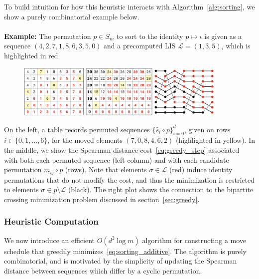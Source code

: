 \documentclass[sn-mathphys]{sn-jnl}
\begin{document}
To build intuition for how this heuristic interacts with Algorithm~\ref{alg:sorting}, we show a purely combinatorial example below.
\\
\\  
\noindent \textbf{Example:} The permutation $p \in S_m$ to sort to the identity $p \mapsto \iota$ is given as a sequence $(4, 2, 7, 1, 8, 6, 3, 5,0)$ and a precomputed LIS $\mathcal{L} = (1, 3, 5)$, which is highlighted in red. 
\begin{figure}[htb!]\label{fig:schedule_construct}
	\center
	\includegraphics[width=0.90\textwidth]{greedy_schedule_construct}
\end{figure}
On the left, a table records permuted sequences $\{ \hat{s}_i \circ p \}_{i=0}^d$, given on rows $i \in \{0, 1, \dots, 6\}$, for the moved elements $(7, 0, 8, 4, 6, 2)$ (highlighted in yellow). 
 In the middle, we show the Spearman distance cost~\eqref{eq:greedy_step} associated with both each permuted sequence (left column) and with each candidate permutation $m_{ij} \circ p$ (rows). Note that elements $\sigma \in \mathcal{L}$ (red) induce identity permutations that do not modify the cost, and thus the minimization is restricted to elements $\sigma \in p \setminus \mathcal{L}$ (black). 
 The right plot shows the connection to the bipartite crossing minimization problem discussed in section~\ref{sec:greedy}.

\subsubsection{Heuristic Computation}
We now introduce an efficient $O(d^2 \log m)$ algorithm for constructing a move schedule that greedily minimizes~\eqref{eq:sorting_additive}. The algorithm is purely combinatorial, and is motivated by the simplicity of updating the Spearman distance between sequences which differ by a cyclic permutation. 
\end{document}
